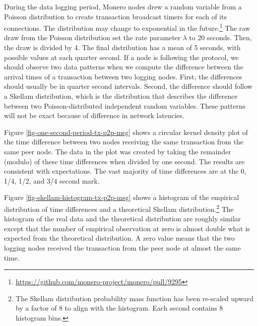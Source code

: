 \documentclass[usletter,11pt,english,openany]{article}
\begin{document}
During the data logging period, Monero nodes drew a random variable
from a Poisson distribution to create transaction broadcast timers
for each of its connections. The distribution may change to exponential
in the future.\footnote{\url{https://github.com/monero-project/monero/pull/9295}}
The raw draw from the Poisson distribution set the rate parameter
$\lambda$ to 20 seconds. Then, the draw is divided by 4. The final
distribution has a mean of 5 seconds, with possible values at each
quarter second. If a node is following the protocol, we should observe
two data patterns when we compute the difference between the arrival
times of a transaction between two logging nodes. First, the differences
should usually be in quarter second intervals. Second, the difference
should follow a Skellam distribution, which is the distribution that
describes the difference between two Poisson-distributed independent
random variables. These patterns will not be exact because of difference
in network latencies.

Figure \ref{fig-one-second-period-tx-p2p-msg} shows a circular kernel
density plot of the time difference between two nodes receiving the
same transaction from the same peer node. The data in the plot was
created by taking the remainder (modulo) of these time differences
when divided by one second. The results are consistent with expectations.
The vast majority of time differences are at the 0, 1/4, 1/2, and
3/4 second mark.

Figure \ref{fig-skellam-histogram-tx-p2p-msg} shows a histogram of
the empirical distribution of time differences and a theoretical Skellam
distribution.\footnote{The Skellam distribution probability mass function has been re-scaled
upward by a factor of 8 to align with the histogram. Each second contains
8 histogram bins. } The histogram of the real data and the theoretical distribution are
roughly similar except that the number of empirical observation at
zero is almost double what is expected from the theoretical distribution.
A zero value means that the two logging nodes received the transaction
from the peer node at almost the same time.
\end{document}
